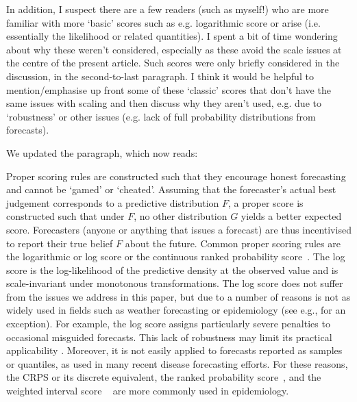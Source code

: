 \documentclass{article}
\newcommand{\black}{\color{black}}
\newcommand{\indented}{\setlength{\leftskip}{1cm}}
\newcommand{\notindented}{\setlength{\leftskip}{0cm}}
\begin{document}
In addition, I suspect there are a few readers (such as myself!) who are more familiar with more ‘basic’ scores such as e.g. logarithmic score or arise (i.e. essentially the likelihood or related quantities). I spent a bit of time wondering about why these weren’t considered, especially as these avoid the scale issues at the centre of the present article. Such scores were only briefly considered in the discussion, in the second-to-last paragraph. I think it would be helpful to mention/emphasise up front some of these ‘classic’ scores that don’t have the same issues with scaling and then discuss why they aren’t used, e.g. due to ‘robustness’ or other issues (e.g. lack of full probability distributions from forecasts).

\black
We updated the paragraph, which now reads: 

\indented

Proper scoring rules are constructed such that they encourage honest forecasting and cannot be `gamed' or `cheated'. 
Assuming that the forecaster's actual best judgement corresponds to a predictive distribution $F$, a proper score is constructed such that under $F$, no other distribution $G$ yields a better expected score. Forecasters (anyone or anything that issues a forecast) are thus incentivised to report their true belief $F$ about the future. Common proper scoring rules are the logarithmic or log score \citep{goodRationalDecisions1952} or the continuous ranked probability score~\citep[CRPS,][]{gneitingStrictlyProperScoring2007}. The log score is the log-likelihood of the predictive density at the observed value and is scale-invariant under monotonous transformations. The log score does not suffer from the issues we address in this paper, but due to a number of reasons is not as widely used in fields such as weather forecasting or epidemiology (see e.g., \citealt{Johansson2019} for an exception). For example, the log score assigns particularly severe penalties to occasional misguided forecasts. This lack of robustness may limit its practical applicability \cite{bracherEvaluatingEpidemicForecasts2021}. Moreover, it is not easily applied to forecasts reported as samples or quantiles, as used in many recent disease forecasting efforts. 
For these reasons, the CRPS or its discrete equivalent, the ranked probability score~\citep[RPS,][]{funkAssessingPerformanceRealtime2019}, and the weighted interval score ~\citep[WIS,][]{bracherEvaluatingEpidemicForecasts2021} are more commonly used in epidemiology. 

\notindented
\end{document}
